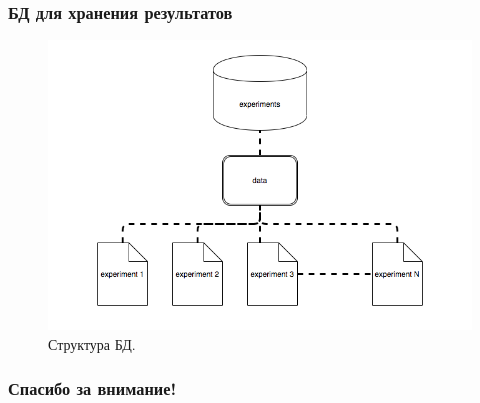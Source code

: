 \documentclass[10pt,utf8,presentation,compress]{beamer}
\begin{document}
\begin{frame}
\frametitle{БД для хранения результатов}
	\begin{figure}[H]
		\centering
		\includegraphics[width=1.0\linewidth]{images/database}
		\caption{Структура БД.}
	\end{figure}
\end{frame}

\begin{frame}[c]
\begin{center}
\frametitle{\LARGE Спасибо за внимание!}

{\LARGE \inserttitle}

\bigskip

{\insertauthor} 

\bigskip\bigskip

{\insertinstitute}

\bigskip\bigskip

{\large \insertdate}
\end{center}
\end{frame}
\end{document}
